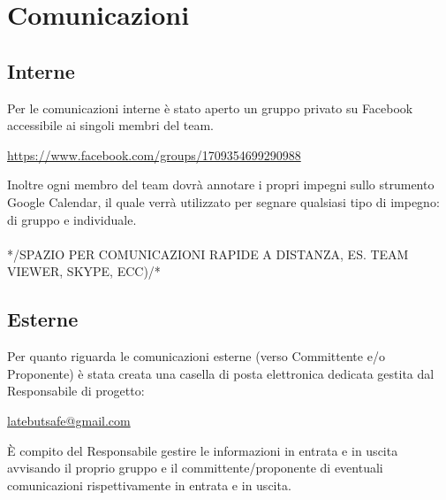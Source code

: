 \section{Comunicazioni}{
	\subsection{Interne}{
		Per le comunicazioni interne è stato aperto un gruppo privato su Facebook accessibile ai singoli membri del team. \begin{center}
			\url{https://www.facebook.com/groups/1709354699290988}
		\end{center} 
		Inoltre ogni membro del team dovrà annotare i propri impegni sullo strumento Google Calendar, il quale verrà utilizzato per segnare qualsiasi tipo di impegno: di gruppo e individuale.\\\\*/SPAZIO PER COMUNICAZIONI RAPIDE A DISTANZA, ES. TEAM VIEWER, SKYPE, ECC)/*
		
	 }
	\subsection{Esterne}{
	Per quanto riguarda le comunicazioni esterne (verso Committente e/o Proponente) è stata creata una casella di posta elettronica dedicata gestita dal Responsabile di progetto: \begin{center}
		\href{mailto:latebutsafe@gmail.com}{latebutsafe@gmail.com} \end{center} È compito del Responsabile gestire le informazioni in entrata e in uscita avvisando il proprio gruppo e il committente/proponente di eventuali comunicazioni rispettivamente in entrata e in uscita.
		}
}